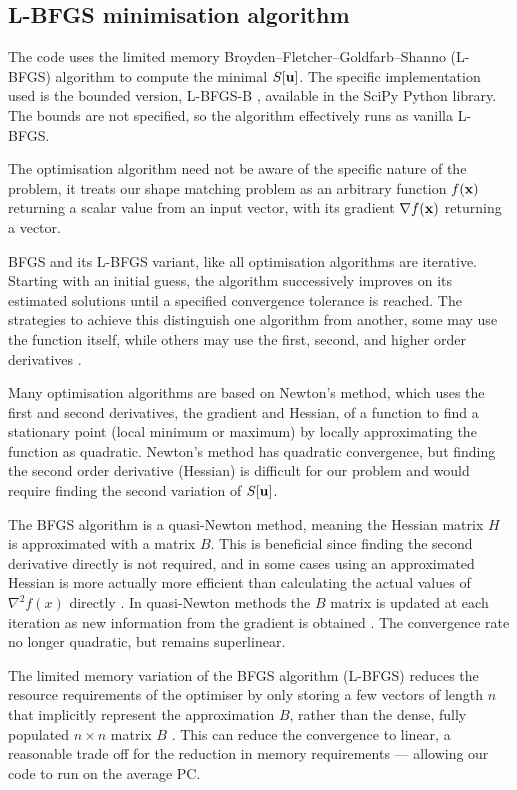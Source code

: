 \documentclass[a4paper, 12pt]{article}
\begin{document}
\subsection{L-BFGS minimisation algorithm}

The code uses the limited memory Broyden--Fletcher--Goldfarb--Shanno \mbox{(L-BFGS)}
 algorithm \cite{byrd1995limited} to compute the minimal $S[\mathbf{u}]$. The
specific implementation used is the bounded version, L-BFGS-B
\cite{zhu1997algorithm}, available in the SciPy Python library. The bounds are
not specified, so the algorithm effectively runs as vanilla L-BFGS.

The optimisation algorithm need not be aware of the specific nature of the
problem, it treats our shape matching problem as an arbitrary function $f(\mathbf{x})$ returning a scalar value from an input vector, with its gradient $\nabla
f(\mathbf{x})$ returning a vector.

BFGS and its L-BFGS variant, like all optimisation algorithms are
iterative. Starting with an initial guess, the algorithm successively improves
on its estimated solutions until a specified convergence tolerance is
reached. The strategies to achieve this distinguish one algorithm from another,
some may use the function itself, while others may use the first, second,
and higher order derivatives \cite{nocedal1999numerical}.

Many optimisation algorithms are based on Newton's method, which uses the first
and second derivatives, the gradient and Hessian, of a function to find a
stationary point (local minimum or maximum) by locally approximating the
function as quadratic. Newton's method has quadratic convergence, but finding
 the second order derivative (Hessian) is difficult for our
 problem and would require finding the second variation of $S[\mathbf{u}]$.

 The BFGS algorithm is a quasi-Newton method, meaning the Hessian matrix $H$ is
 approximated with a matrix $B$. This is beneficial since finding the second
 derivative directly is not required, and in some cases using an approximated
 Hessian is more actually more efficient than calculating the actual values of
 $\nabla^2 f(x)$ directly \cite{nocedal1999numerical}. In quasi-Newton methods
 the $B$ matrix is updated at each iteration as new information from the
 gradient is obtained \cite{nocedal1999numerical}. The convergence rate no
 longer quadratic, but remains superlinear.


The limited memory variation of the BFGS algorithm (L-BFGS) reduces the resource
requirements of the optimiser by only storing a few vectors of length $n$ that
implicitly represent the approximation $B$, rather than the dense, fully populated 
$n\times n$ matrix $B$ \cite{nocedal1999numerical}. This
can reduce the convergence to linear, a reasonable trade off for
the reduction in memory requirements --- allowing our code to run on the average PC.
\end{document}
